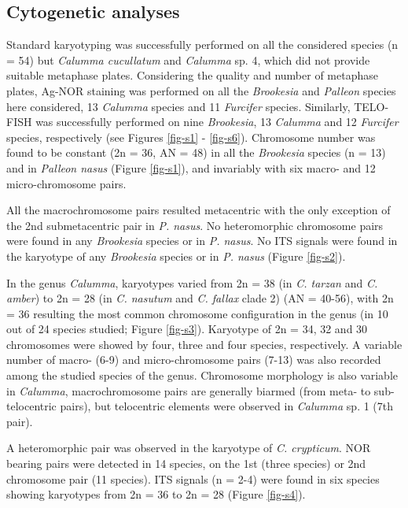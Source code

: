 \documentclass[a4paper, 12pt]{article}
\begin{document}
\subsection{Cytogenetic analyses}

Standard karyotyping was successfully performed on all the considered species (n = 54) but \textit{Calumma cucullatum} and \textit{Calumma} sp. 4, which did not provide suitable metaphase plates.
Considering the quality and number of metaphase plates, Ag-NOR staining was performed on all the \textit{Brookesia} and \textit{Palleon} species here considered, 13 \textit{Calumma} species and 11 \textit{Furcifer} species. 
Similarly, TELO-FISH was successfully performed on nine \textit{Brookesia}, 13 \textit{Calumma} and 12 \textit{Furcifer} species, respectively (see Figures \ref{fig-s1} - \ref{fig-s6}).
Chromosome number was found to be constant (2n = 36, AN = 48) in all the \textit{Brookesia} species (n = 13) and in \textit{Palleon nasus} (Figure \ref{fig-s1}), and invariably with six macro- and 12 micro-chromosome pairs.

\noindent All the macrochromosome pairs resulted metacentric with the only exception of the 2nd submetacentric pair in \textit{P. nasus}. 
No heteromorphic chromosome pairs were found in any \textit{Brookesia} species or in \textit{P. nasus}.
No ITS signals were found in the karyotype of any \textit{Brookesia} species or in \textit{P. nasus} (Figure \ref{fig-s2}).

\noindent In the genus \textit{Calumma}, karyotypes varied from 2n = 38 (in \textit{C. tarzan} and \textit{C. amber}) to 2n = 28 (in \textit{C. nasutum} and \textit{C. fallax} clade 2) (AN = 40-56), with 2n = 36 resulting the most common chromosome configuration in the genus (in 10 out of 24 species studied; Figure \ref{fig-s3}). 
Karyotype of 2n = 34, 32 and 30 chromosomes were showed by four, three and four species, respectively. 
A variable number of macro- (6-9) and micro-chromosome pairs (7-13) was also recorded among the studied species of the genus. 
Chromosome morphology is also variable in \textit{Calumma}, macrochromosome pairs are generally biarmed (from meta- to sub-telocentric pairs), but telocentric elements were observed in \textit{Calumma} sp. 1 (7th pair). 

\noindent A heteromorphic pair was observed in the karyotype of \textit{C. crypticum}. 
NOR bearing pairs were detected in 14 species, on the 1st (three species) or 2nd chromosome pair (11 species). 
ITS signals (n = 2-4) were found in six species showing karyotypes from 2n = 36 to 2n = 28 (Figure \ref{fig-s4}).
\end{document}
